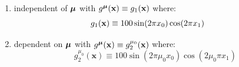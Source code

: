 \documentclass[
    conference,
    nofonttune,
    11pt
]{IEEEtran}
\begin{document}
            \begin{enumerate}[
                label=C\arabic*.,
                rightmargin=0cm
            ]
                \item\label{hypIndependentSourceTerm} independent of ${\boldsymbol\mu}$ with $g^{\boldsymbol\mu}(\mathbf x)\equiv g_1(\mathbf x)$ where:
                    \begin{equation}
                        \label{eqIndependentSourceTerm}
                        \begin{aligned}
                            g_1(\mathbf x)&\equiv
                            100\sin(2\pi x_0)\cos(2\pi x_1)\\[-3.5ex]
                            &\hphantom{\equiv100\sin(2\pi\mu_0x_0)\cos(2\mu_0\pi x_1)}
                        \end{aligned}
                    \end{equation}
            
                \item\label{hypDependentSourceTerm} dependent on ${\boldsymbol\mu}$ with $g^{\boldsymbol\mu}(\mathbf x)\equiv g^{\mu_0}_2(\mathbf x)$ where:
                    \begin{equation}
                        \label{eqDependentSourceTerm}
                        g^{\mu_0}_2(\mathbf x)\equiv
                        100\sin(2\pi\mu_0x_0)\cos(2\mu_0\pi x_1)
                    \end{equation}
            \end{enumerate}
            
\end{document}
